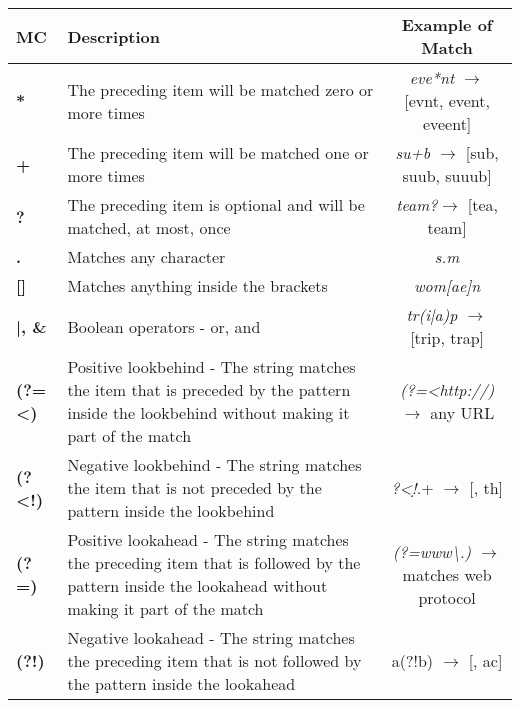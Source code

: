 \begin{table}
\centering
\renewcommand{\arraystretch}{1.25}
\begin{tabular}{ABC}
\toprule
\textbf{MC} & \textbf{Description} & \textbf{Example of Match}\\
\midrule
\textbf{*} & The preceding item will be matched zero or more times & \textit{eve*nt} $\rightarrow$ [evnt, event, eveent]\\

\textbf{+} & The preceding item will be matched one or more times & \textit{su+b} $\rightarrow$ [sub, suub, suuub]\\

\textbf{?} & The preceding item is optional and will be matched, at most, once & \textit{team?}$\rightarrow$ [tea, team]\\

\textbf{.} & Matches any character & \textit{s.m}  \\

\textbf{[]} & Matches anything inside the brackets & \textit{wom[ae]n}  \\

\textbf{|, \&} & Boolean operators - or, and & \textit{tr(i|a)p} $\rightarrow$ [trip, trap]\\

\textbf{(?=<)} & Positive lookbehind - The string matches the item that is preceded by the pattern inside the lookbehind without making it part of the match & \textit{(?=<http://)} $\rightarrow$ any URL\\

\textbf{(?<!)} & Negative lookbehind - The string matches the item that is not preceded by the pattern inside the lookbehind & \textit{?<!\d*}.+ $\rightarrow$ [, th]\\

\textbf{(?=)} & Positive lookahead - The string matches the preceding item that is followed by the pattern inside the lookahead without making it part of the match & \textit{(?=www\backslash .)} $\rightarrow$ matches web protocol\\

\textbf{(?!)} & Negative lookahead - The string matches the preceding item that is not followed by the pattern inside the lookahead & a(?!b) $\rightarrow$ [, ac]\\
\bottomrule
\end{tabular}
\end{table}



